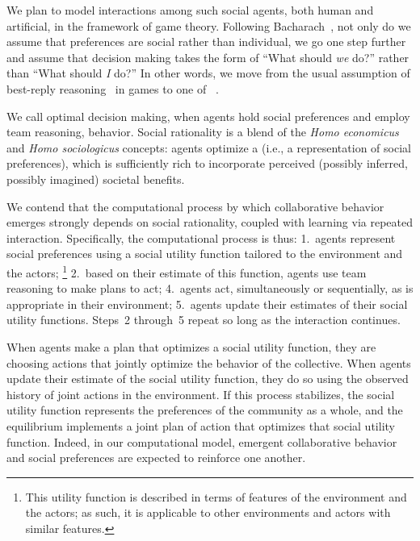 We plan to model interactions among such social agents, both human and
artificial, in the framework of game theory.  
%
Following Bacharach~\cite{bacharach2006beyond}, not only do we assume
that preferences are social rather than individual, we go one step
further and assume that decision making takes the form of ``What
should \emph{we\/} do?'' rather than ``What should \emph{I\/} do?''
In other words, we move from the usual assumption of best-reply
reasoning~\cite{cournot} in games to one of ~\cite{RePEc:eee:reecon:v:53:y:1999:i:2:p:117-147}.

We call optimal decision making, when agents hold
social preferences and employ team reasoning,  behavior.  Social rationality is a blend of the \emph{Homo
  economicus\/} and \emph{Homo sociologicus\/} concepts: agents
optimize a  (i.e., a representation of
social preferences), which is sufficiently rich to incorporate
perceived (possibly inferred, possibly imagined) societal benefits.

We contend that the computational process by which collaborative
behavior emerges strongly depends on social rationality, coupled with
learning via repeated interaction.
%
Specifically, the computational process is thus:
1.~agents represent social preferences using a social utility function
tailored to the environment and the actors;%
\footnote{This utility function is described in terms of features of the environment and the actors;
as such, it is applicable to other environments and actors with similar features.}
2.~based on their estimate of this function, agents use team reasoning to make plans to act;
4.~agents act, simultaneously or sequentially, as is appropriate in their environment;
5.~agents update their estimates of their social utility functions.
Steps~2 through~5 repeat so long as the interaction continues.

When agents
make a plan that optimizes a social
utility function, they are choosing actions that jointly optimize the
behavior of the collective.
When agents update their estimate of the social utility function, they
do so using the observed history of joint actions in the environment.
If this process stabilizes, the social utility function represents the
preferences of the community as a whole, 
and the equilibrium implements a joint plan of action that optimizes
that social utility function.  Indeed, in our computational model,
emergent collaborative behavior and social preferences are expected to
reinforce one another.

